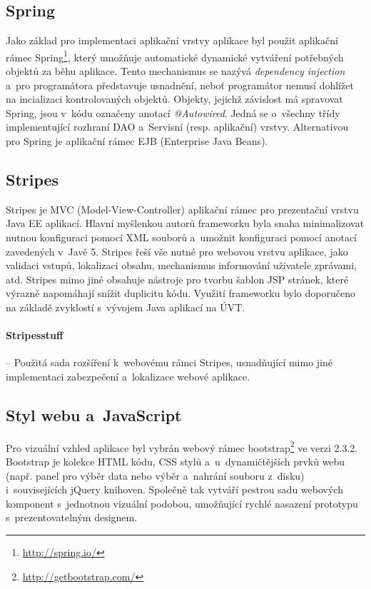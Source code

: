 \documentclass[11pt, draft, oneside]{fithesis2}
\begin{document}
\subsection{Spring}
Jako základ pro implementaci aplikační vrstvy aplikace byl použit aplikační rámec Spring\footnote{\url{http://spring.io/}}, který umožňuje automatické dynamické vytváření potřebných objektů za běhu aplikace. Tento mechanismus se nazývá \textit{dependency injection} a~pro programátora představuje usnadnění, neboť programátor nemusí dohlížet na incializaci kontrolovaných objektů. Objekty, jejichž závislost má spravovat Spring, jsou v~kódu označeny anotací \textit{@Autowired}. Jedná se o~všechny třídy implementující rozhraní DAO a~Servisní (resp. aplikační) vrstvy.
Alternativou pro Spring je aplikační rámec EJB (Enterprise Java Beans).

\subsection{Stripes}
Stripes je MVC (Model-View-Controller) aplikační rámec pro prezentační vrstvu Java EE aplikací. Hlavní myšlenkou autorů frameworku byla snaha minimalizovat nutnou konfiguraci pomocí XML souborů a~umožnit konfiguraci pomocí anotací zavedených v~Javě 5. Stripes řeší vše nutné pro webovou vrstvu aplikace, jako validaci vstupů, lokalizaci obsahu, mechanismus informování uživatele zprávami, atd. Stripes mimo jiné obsahuje nástroje pro tvorbu šablon JSP stránek, které výrazně napomáhají snížit duplicitu kódu.
Využití frameworku bylo doporučeno na základě zvyklostí s~vývojem Java aplikací na ÚVT.

\paragraph*{Stripesstuff} -- Použitá sada rozšíření k~webovému rámci Stripes, usnadňující mimo jiné implementaci zabezpečení a~lokalizace webové aplikace. 

\subsection{Styl webu a~JavaScript}
Pro vizuální vzhled aplikace byl vybrán webový rámec bootstrap\footnote{\url{http://getbootstrap.com/}} ve verzi 2.3.2. Bootstrap je kolekce HTML kódu, CSS stylů a~u~dynamičtějších prvků webu (např. panel pro výběr data nebo výběr a~nahrání souboru z~disku) i~souvisejících jQuery knihoven. Společně tak vytváří pestrou sadu webových komponent s~jednotnou vizuální podobou, umožňující rychlé nasazení prototypu s~prezentovatelným designem. 
\end{document}
